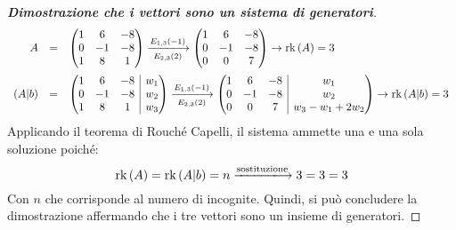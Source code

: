 \documentclass[a4paper]{article}
\makeatletter
\DeclareMathOperator{\rk}{rk}
\newenvironment{rowequmat}[1]{\left(\array{@{}#1@{}}}{\endarray\right)}
\makeatother
\begin{document}
\begin{proof}[\textbf{Dimostrazione che i vettori sono un sistema di generatori}]
		\begin{equation*}
				\begin{array}{rll}
					A &=& \begin{rowequmat}{ccc}
						1 &  6 & -8 \\
						0 & -1 & -8 \\
						1 &  8 &  1
					\end{rowequmat} \xlongrightarrow[E_{2,3}\left(2\right)]{E_{1,3}\left(-1\right)}
					\begin{rowequmat}{ccc}
						1 &  6 & -8 \\
						0 & -1 & -8 \\
						0 &  0 &  7
					\end{rowequmat} \rightarrow \rk\left(A\right) = 3 \\ [1.8em]
					\left(A|b\right) &=& \begin{rowequmat}{ccc|c}
						1 &  6 & -8 & w_{1} \\
						0 & -1 & -8 & w_{2} \\
						1 &  8 &  1 & w_{3}
					\end{rowequmat} \xlongrightarrow[E_{2,3}\left(2\right)]{E_{1,3}\left(-1\right)}
					\begin{rowequmat}{ccc|c}
						1 &  6 & -8 & w_{1} \\
						0 & -1 & -8 & w_{2} \\
						0 &  0 &  7 & w_{3} - w_{1} + 2w_{2}
					\end{rowequmat} \rightarrow \rk\left(A|b\right) = 3
				\end{array}
		\end{equation*}
		Applicando il teorema di Rouché Capelli, il sistema ammette una e una sola soluzione poiché:
		\begin{equation*}
			\rk\left(A\right) = \rk\left(A|b\right) = n \xlongrightarrow{\text{sostituzione}} 3 = 3 = 3
		\end{equation*}
		Con $n$ che corrisponde al numero di incognite. Quindi, si può concludere la dimostrazione affermando che i tre vettori sono un insieme di generatori.
	\end{proof}\newpage
	
\end{document}
